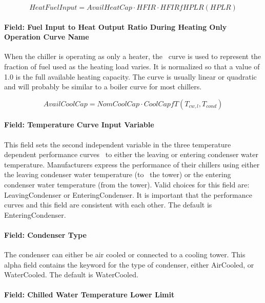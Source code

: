 \begin{equation}
    HeatFuelInput = AvailHeatCap \cdot HFIR \cdot HFIRfHPLR(HPLR)
\end{equation}

\paragraph{Field: Fuel Input to Heat Output Ratio During Heating Only Operation Curve Name}\label{field-fuel-input-to-heat-output-ratio-during-heating-only-operation-curve-name}

When the chiller is operating as only a heater, the~ curve is used to represent the fraction of fuel used as the heating load varies. It is normalized so that a value of 1.0 is the full available heating capacity. The curve is usually linear or quadratic and will probably be similar to a boiler curve for most chillers.

\begin{equation}
    AvailCoolCap = NomCoolCap \cdot CoolCapfT({T_{cw,l}},{T_{cond}})
\end{equation}

\paragraph{Field: Temperature Curve Input Variable}\label{field-temperature-curve-input-variable}

This field sets the second independent variable in the three temperature dependent performance curves~ to either the leaving or entering condenser water temperature. Manufacturers express the performance of their chillers using either the leaving condenser water temperature (to~ the tower) or the entering condenser water temperature (from the tower). Valid choices for this field are: LeavingCondenser or EnteringCondenser. It is important that the performance curves and this field are consistent with each other. The default is EnteringCondenser.

\paragraph{Field: Condenser Type}\label{field-condenser-type-5-000}

The condenser can either be air cooled or connected to a cooling tower. This alpha field contains the keyword for the type of condenser, either AirCooled, or WaterCooled. The default is WaterCooled.

\paragraph{Field: Chilled Water Temperature Lower Limit}\label{field-chilled-water-temperature-lower-limit}

